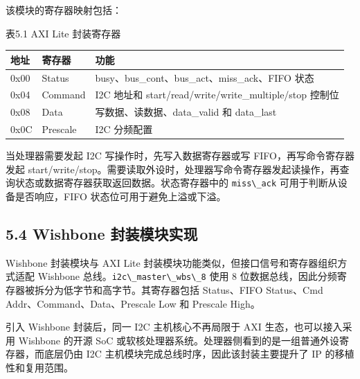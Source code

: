 该模块的寄存器映射包括：

表5.1 AXI Lite 封装寄存器

{\def\LTcaptype{none} %
\begin{longtable}[]{@{}
  >{\raggedright\arraybackslash}p{}
  >{\raggedright\arraybackslash}p{}
  >{\raggedright\arraybackslash}p{}@{}}
\toprule\noalign{}
\begin{minipage}[b]{\linewidth}\raggedright
地址
\end{minipage} & \begin{minipage}[b]{\linewidth}\raggedright
寄存器
\end{minipage} & \begin{minipage}[b]{\linewidth}\raggedright
功能
\end{minipage} \\
\midrule\noalign{}
\endhead
\bottomrule\noalign{}
\endlastfoot
0x00 & Status & busy、bus\_cont、bus\_act、miss\_ack、FIFO 状态 \\
0x04 & Command & I2C 地址和 start/read/write/write\_multiple/stop
控制位 \\
0x08 & Data & 写数据、读数据、data\_valid 和 data\_last \\
0x0C & Prescale & I2C 分频配置 \\
\end{longtable}
}

当处理器需要发起 I2C 写操作时，先写入数据寄存器或写
FIFO，再写命令寄存器发起
start/write/stop。需要读取外设时，处理器写命令寄存器发起读操作，再查询状态或数据寄存器获取返回数据。状态寄存器中的
\passthrough{\lstinline!miss\_ack!} 可用于判断从设备是否响应，FIFO
状态位可用于避免上溢或下溢。

\subsection{5.4 Wishbone
封装模块实现}\label{wishbone-ux5c01ux88c5ux6a21ux5757ux5b9eux73b0}

Wishbone 封装模块与 AXI Lite
封装模块功能类似，但接口信号和寄存器组织方式适配 Wishbone
总线。\passthrough{\lstinline!i2c\_master\_wbs\_8!} 使用 8
位数据总线，因此分频寄存器被拆分为低字节和高字节。其寄存器包括
Status、FIFO Status、Cmd Addr、Command、Data、Prescale Low 和 Prescale
High。

引入 Wishbone 封装后，同一 I2C 主机核心不再局限于 AXI
生态，也可以接入采用 Wishbone 的开源 SoC
或软核处理器系统。处理器侧看到的是一组普通外设寄存器，而底层仍由 I2C
主机模块完成总线时序，因此该封装主要提升了 IP 的移植性和复用范围。

